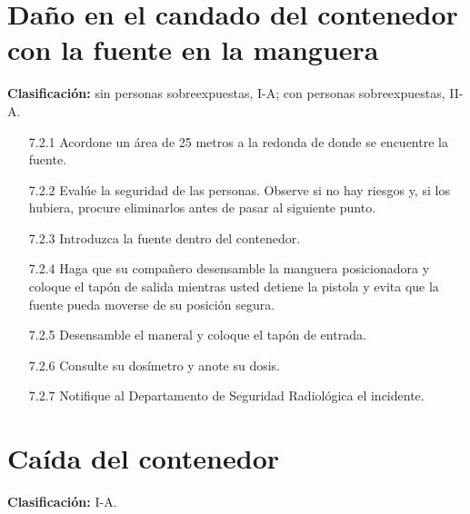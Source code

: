 \section{Daño en el candado del contenedor con la fuente en la manguera}

\textbf{Clasificación:} sin personas sobreexpuestas, I-A; con personas sobreexpuestas, II-A.

\begin{enumerate}
  \item[7.2.1] Acordone un área de 25 metros a la redonda de donde se encuentre la fuente.
  \item[7.2.2] Evalúe la seguridad de las personas. Observe si no hay riesgos y, si los hubiera, procure eliminarlos antes de pasar al siguiente punto.
  \item[7.2.3] Introduzca la fuente dentro del contenedor.
  \item[7.2.4] Haga que su compañero desensamble la manguera posicionadora y coloque el tapón de salida mientras usted detiene la pistola y evita que la fuente pueda moverse de su posición segura.
  \item[7.2.5] Desensamble el maneral y coloque el tapón de entrada.
  \item[7.2.6] Consulte su dosímetro y anote su dosis.
  \item[7.2.7] Notifique al Departamento de Seguridad Radiológica el incidente.
\end{enumerate}

\section{Caída del contenedor}

\textbf{Clasificación:} I-A.

